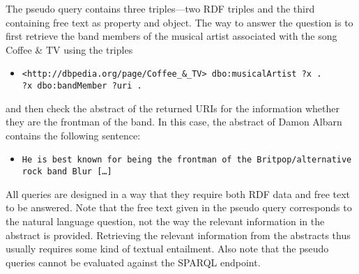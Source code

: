 The pseudo query contains three triples---two RDF triples and the third containing free text as property and object. 
The way to answer the question is to first retrieve the band members of the musical artist associated with the song Coffee \& TV 
using the triples
\begin{itemize}
\item[] \texttt{<http://dbpedia.org/page/Coffee\_\&\_TV> dbo:musicalArtist ?x .} \\
        \texttt{?x dbo:bandMember ?uri .} 
\end{itemize}
and then check the abstract of the returned URIs for the information whether they are the frontman of the band.
In this case, the abstract of Damon Albarn contains the following sentence: 
\begin{itemize}
\item[] \texttt{He is best known for being the frontman of the Britpop/alternative rock band Blur [\ldots]}
\end{itemize}

All queries are designed in a way that they require both RDF data and free text to be answered. 
Note that the free text given in the pseudo query corresponds to the natural language question, 
not the way the relevant information in the abstract is provided. Retrieving the relevant information  
from the abstracts thus usually requires some kind of textual entailment.
Also note that the pseudo queries cannot be evaluated against the SPARQL endpoint. 
